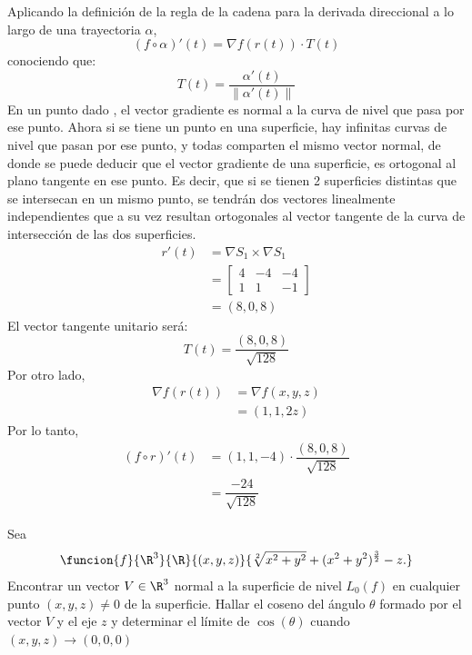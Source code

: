 \documentclass[a4,11pt]{aleph-examen}
\begin{document}
\begin{preguntas}
\begin{respuesta}
\begin{respuesta}
    \begin{respuesta}
Aplicando la definición de la regla de la cadena para la derivada direccional a lo largo de una trayectoria $\alpha$,
	\[
        (f\circ \alpha)'(t)=\nabla f(r(t)) \cdot T(t)
    \]
conociendo que:
	\[
        T(t)=\dfrac{\alpha'(t)}{\|\alpha'(t)\|}
    \]
En un punto dado , el vector gradiente es normal a la curva de nivel que pasa por ese punto. Ahora si se tiene un punto en una superficie, hay infinitas curvas de nivel que pasan por ese punto, y todas comparten el mismo vector normal, de donde se puede deducir que el vector gradiente de una superficie, es ortogonal al plano tangente en ese punto. Es decir, que si se tienen 2 superficies distintas que se intersecan en un mismo punto, se tendrán dos vectores linealmente independientes que a su vez resultan ortogonales al vector tangente de la curva de intersección de las dos superficies. 
	\[
    \begin{aligned}
        r'(t) & = \nabla S_1 \times \nabla S_1\\
        & = \begin{bmatrix}
    	4 & -4 & -4\\
   		1 & 1 & -1
		\end{bmatrix}\\
        & = (8,0,8)
    \end{aligned}
    \]
El vector tangente unitario será:
	\[
        T(t)=\dfrac{(8,0,8)}{\sqrt{128}}
    \]
Por otro lado,
	\[
    \begin{aligned}
	\nabla f(r(t)) & = \nabla f(x,y,z)\\
    & = (1,1,2z)
    \end{aligned}
    \]
Por lo tanto,
	\[
    \begin{aligned}
        (f\circ r)'(t) & = (1,1,-4) \cdot \dfrac{(8,0,8)}{\sqrt{128}}\\
        & = \dfrac{-24}{\sqrt{128}}
        \end{aligned}
    \]
\end{respuesta}

\item 
    Sea 
    \[
        \funcion{f}{\R^3}{\R}{(x,y,z)}
        {\sqrt[2]{x^2+y^2}+(x^2+y^2)^\frac{3}{2}-z.}
    \]
    Encontrar un vector $V \in \R^3$ normal a la superficie de nivel $L_0(f)$ en cualquier punto $(x,y,z) \neq 0$ de la superficie. Hallar el coseno del ángulo $\theta$ formado por el vector $V$ y el eje $z$ y determinar el límite de $\cos(\theta)$ cuando $(x,y,z) \to (0,0,0)$  
    

\end{respuesta}
\end{respuesta}
\end{preguntas}
\end{document}
